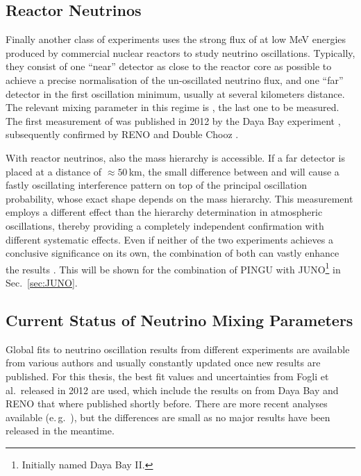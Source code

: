 \subsection{Reactor Neutrinos}
\label{sec:ReacNuOsc}

Finally another class of experiments uses the strong flux of \nuebar at low MeV
energies produced by commercial nuclear reactors to study neutrino
oscillations. Typically, they consist of one ``near'' detector as close to the
reactor core as possible to achieve a precise normalisation of the
un-oscillated neutrino flux, and one ``far'' detector in the first oscillation
minimum, usually at several kilometers distance.
The relevant mixing parameter in this regime is , the last one to be
measured. The first measurement of  was published in 2012 by the Daya
Bay experiment \cite{DayaBay}, subsequently confirmed by RENO and Double Chooz
\cite{RENO, DoubleChooz}.

With reactor neutrinos, also the mass hierarchy is accessible. If a far detector
is placed at a distance of $\approx 50$\,km, the small difference between
 and  will cause a fastly oscillating interference pattern on top
of the principal oscillation probability, whose exact shape depends on the mass
hierarchy. This measurement employs a different effect than the hierarchy
determination in atmospheric oscillations, thereby providing a completely
independent confirmation with different systematic effects. Even if neither of
the two experiments achieves a conclusive significance on its own, the
combination of both can vastly enhance the results \cite{BlennowSchwetz}. This
will be shown for the combination of PINGU with JUNO\footnote{Initially named
Daya Bay II.} \cite{JUNO, JUNO2} in Sec.~\ref{sec:JUNO}.

\subsection{Current Status of Neutrino Mixing Parameters}
\label{sec:MixingParams}

Global fits to neutrino oscillation results from different experiments are
available from various authors and usually constantly updated once new results
are published. For this thesis, the best fit values and uncertainties from Fogli
et al.\ released in 2012 \cite{Fogli2012} are used, which include the results
on  from Daya Bay and RENO that where published shortly before. There
are more recent analyses available (e.\,g.\ \cite{Capozzi2013,
GonzalezGarcia2014}), but the differences are small as no major results have
been released in the meantime.

